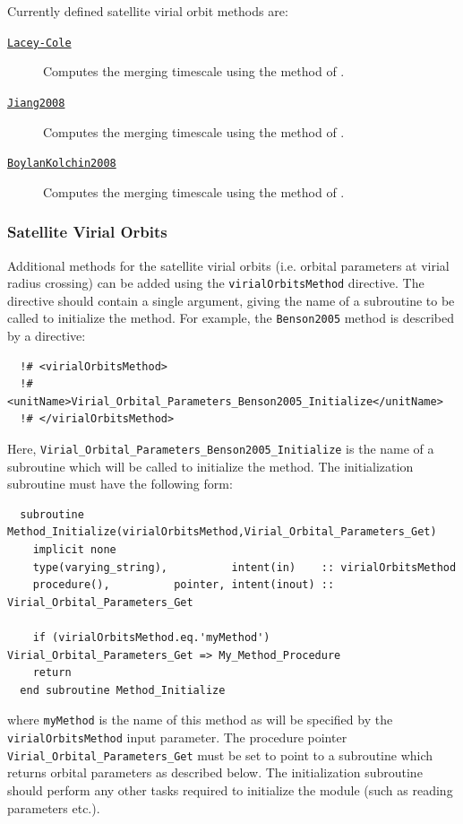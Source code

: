 Currently defined satellite virial orbit methods are:
\begin{description}
 \item [\hyperlink{satellites.merging.dynamical_friction.timescale.Lacey-Cole.F90:dynamical_friction_lacey_cole:satellite_time_until_merging_lacey_cole}{{\tt Lacey-Cole}}] Computes the merging timescale using the method of \cite{lacey_merger_1993}.
 \item [\hyperlink{satellites.merging.dynamical_friction.timescale.Jiang2008.F90:dynamical_friction_jiang2008:satellite_time_until_merging_jiang2008}{{\tt Jiang2008}}] Computes the merging timescale using the method of \cite{jiang_fitting_2008}.
 \item [\hyperlink{satellites.merging.dynamical_friction.timescale.Boylan-Kolchin2008.F90:dynamical_friction_boylankolchin2008:satellite_time_until_merging_boylankolchin2008}{{\tt BoylanKolchin2008}}] Computes the merging timescale using the method of \cite{boylan-kolchin_dynamical_2008}.
\end{description}

\subsubsection{Satellite Virial Orbits}

Additional methods for the satellite virial orbits (i.e. orbital parameters at virial radius crossing) can be added using the {\tt virialOrbitsMethod} directive. The directive should contain a single argument, giving the name of a subroutine to be called to initialize the method. For example, the {\tt Benson2005} method is described by a directive:
\begin{verbatim}
  !# <virialOrbitsMethod>
  !#  <unitName>Virial_Orbital_Parameters_Benson2005_Initialize</unitName>
  !# </virialOrbitsMethod>
\end{verbatim}
Here, {\tt Virial\_Orbital\_Parameters\_Benson2005\_Initialize} is the name of a subroutine which will be called to initialize the method. The initialization subroutine must have the following form:
\begin{verbatim}
  subroutine Method_Initialize(virialOrbitsMethod,Virial_Orbital_Parameters_Get)
    implicit none
    type(varying_string),          intent(in)    :: virialOrbitsMethod
    procedure(),          pointer, intent(inout) :: Virial_Orbital_Parameters_Get
    
    if (virialOrbitsMethod.eq.'myMethod') Virial_Orbital_Parameters_Get => My_Method_Procedure
    return
  end subroutine Method_Initialize
\end{verbatim}
where {\tt myMethod} is the name of this method as will be specified by the {\tt virialOrbitsMethod} input parameter. The procedure pointer {\tt Virial\_Orbital\_Parameters\_Get} must be set to point to a subroutine which returns orbital parameters as described below. The initialization subroutine should perform any other tasks required to initialize the module (such as reading parameters etc.).

